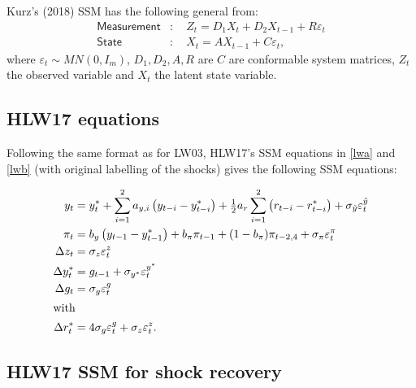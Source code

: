 \documentclass[a4paper,12pt]{article}
\newcommand{\bsq}{\begin{subequations}}\newcommand{\esq}{\end{subequations}}
\newcommand{\intxt}[1]{\intertext{#1}}\newcommand{\BAW}[1]{\begin{adjustwidth}{-#1mm}{-5mm}}\newcommand{\EAW}{\end{adjustwidth}}
\begin{document}
Kurz's (2018) SSM has the following general from:\bsq\label{SSM}%
\begin{align}
\mathsf{Measurement}& :\quad Z_{t}=D_{1}X_{t}+D_{2}X_{t-1}+R\varepsilon _{t}
\label{ssm1} \\
\mathsf{State}& :\quad X_{t}=AX_{t-1}+C\varepsilon _{t},  \label{ssm2}
\end{align}%
\esq where $\varepsilon _{t}\sim MN(0,I_{m})$, $D_{1},D_{2},A,R$ are $C$ are
conformable system matrices, $Z_{t}$ the observed variable and $X_{t}$ the
latent state variable.

\subsection{HLW17 equations}

Following the same format as for LW03, HLW17's SSM equations in \ref{lwa}
and \ref{lwb} (with original labelling of the shocks) gives the following
SSM equations:

\pagebreak \bsq\label{LW03}%
\begin{align}
y_{t}& =y_{t}^{\ast }+\sum_{i=1}^{2}a_{y,i}\left( y_{t-i}-y_{t-i}^{\ast
}\right) +\tfrac{1}{2}a_{r}\sum_{i=1}^{2}\left( r_{t-i}-r_{t-i}^{\ast
}\right) +\sigma _{\tilde{y}}\varepsilon _{t}^{\tilde{y}}  \label{LW03a} \\
\pi _{t}& =b_{y}\left( y_{t-1}-y_{t-1}^{\ast }\right) +b_{\pi }\pi
_{t-1}+(1-b_{\pi })\pi _{t-2,4}+\sigma _{\pi }\varepsilon _{t}^{\pi } \\
\Delta z_{t}& =\sigma _{z}\varepsilon _{t}^{z}  \label{LW03c} \\
\Delta y_{t}^{\ast }& =g_{t-1}+\sigma _{y^{\ast }}\varepsilon _{t}^{y^{\ast
}}  \label{LW03d} \\
\Delta g_{t}& =\sigma _{g}\varepsilon _{t}^{g}  \label{LW03e} \\
\intxt{with}\Delta r_{t}^{\ast }& =4\sigma _{g}\varepsilon _{t}^{g}+\sigma
_{z}\varepsilon _{t}^{z}.  \label{LW03f}
\end{align}%
\esq

\subsection{HLW17 SSM for shock recovery}
\end{document}
